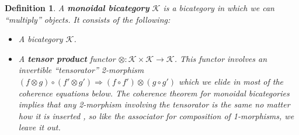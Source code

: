 \documentclass[12pt,twoside,openright]{report}
\newtheorem{defn}{Definition}
\newcommand{\C}{ {\mathcal{K}}  }
\begin{document}
\begin{defn} A {\bf monoidal bicategory} $\C$ is a bicategory in which we can ``multiply'' objects.  It consists of the following: \\
  
\begin{itemize}
\item A bicategory $\C$.
\item A {\bf tensor product} functor $\otimes:\C \times \C \rightarrow
\C$.  This functor involves an invertible ``tensorator'' 2-morphism
$(f \otimes g) \circ (f' \otimes g') \Rightarrow 
(f \circ f') \otimes (g \circ g')$ which we elide in most of the coherence equations below.  The coherence theorem for monoidal bicategories implies that any 2-morphism involving the tensorator is the same no matter how it is inserted \cite[Remark~3.1.6]{Gurski}, so like the associator for composition of 1-morphisms, we leave it out.


\end{itemize}
\end{defn}
\end{document}
